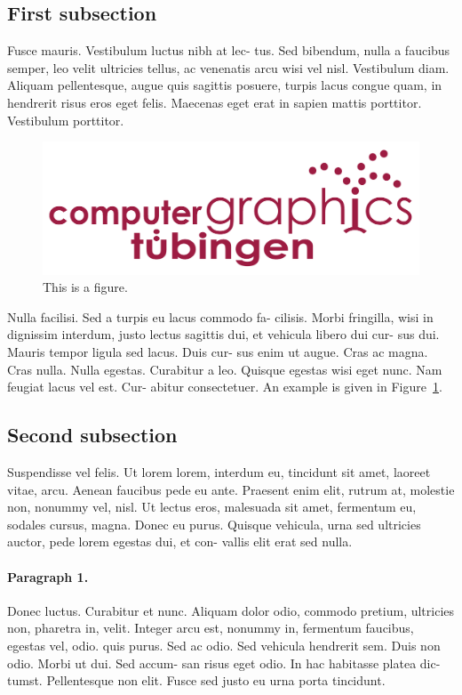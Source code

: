 \documentclass{utue} %
\begin{document}
\subsection{First subsection}
Fusce mauris. Vestibulum luctus nibh at lec-
tus. Sed bibendum, nulla a faucibus semper, leo
velit ultricies tellus, ac venenatis arcu wisi vel nisl.
Vestibulum diam. Aliquam pellentesque, augue
quis sagittis posuere, turpis lacus congue quam, in
hendrerit risus eros eget felis. Maecenas eget erat
in sapien mattis porttitor. Vestibulum porttitor.
\begin{figure}[h!]
  \centering
  \includegraphics[width=.9\columnwidth]{images/tuebingen4b_um_rot_small.pdf}
  \caption{\label{fig:figure1}This is a figure.}
\end{figure}
Nulla facilisi. Sed a turpis eu lacus commodo fa-
cilisis. Morbi fringilla, wisi in dignissim interdum,
justo lectus sagittis dui, et vehicula libero dui cur-
sus dui. Mauris tempor ligula sed lacus. Duis cur-
sus enim ut augue. Cras ac magna. Cras nulla.
Nulla egestas. Curabitur a leo. Quisque egestas
wisi eget nunc. Nam feugiat lacus vel est. Cur-
abitur consectetuer.
An example is given in Figure~\ref{fig:figure1}.

\subsection{Second subsection}
Suspendisse vel felis. Ut lorem lorem, interdum
eu, tincidunt sit amet, laoreet vitae, arcu. Aenean
faucibus pede eu ante. Praesent enim elit, rutrum
at, molestie non, nonummy vel, nisl. Ut lectus eros,
malesuada sit amet, fermentum eu, sodales cursus,
magna. Donec eu purus. Quisque vehicula, urna
sed ultricies auctor, pede lorem egestas dui, et con-
vallis elit erat sed nulla.
\paragraph{Paragraph 1.} Donec luctus. Curabitur
et nunc. Aliquam dolor odio, commodo pretium,
ultricies non, pharetra in, velit. Integer arcu est,
nonummy in, fermentum faucibus, egestas vel, odio.
quis purus. Sed ac odio. Sed vehicula hendrerit
sem. Duis non odio. Morbi ut dui. Sed accum-
san risus eget odio. In hac habitasse platea dic-
tumst. Pellentesque non elit. Fusce sed justo eu
urna porta tincidunt.
\end{document}
